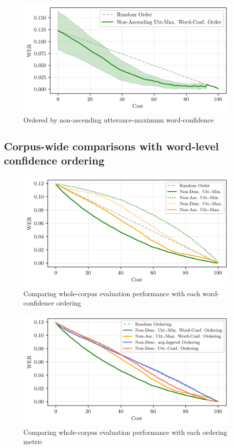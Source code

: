 \begin{figure}[p]
 \caption{Ordered by non-ascending utterance-maximum word-confidence}
 \label{fig:word-conf-comparison-plot4}
 \includegraphics[width=\textwidth]{figures/word-conf-comparison-plot4.png}
 \centering
\end{figure}

\clearpage
\subsection{Corpus-wide comparisons with word-level confidence ordering}\label{subsec:comparing-all}

\begin{figure}[h!]
 \caption{Comparing whole-corpus evaluation performance with each word-confidence ordering}
 \label{fig:corpus-all-word-conf-measures}
 \includegraphics[width=\textwidth]{figures/corpus-all-word-conf-measures.png}
 \centering
\end{figure}
\begin{figure}[h!]
 \caption{Comparing whole-corpus evaluation performance with each ordering metric}
 \label{fig:corpus-allmeasures}
 \includegraphics[width=\textwidth]{figures/corpus-allmeasures.png}
 \centering
\end{figure}
